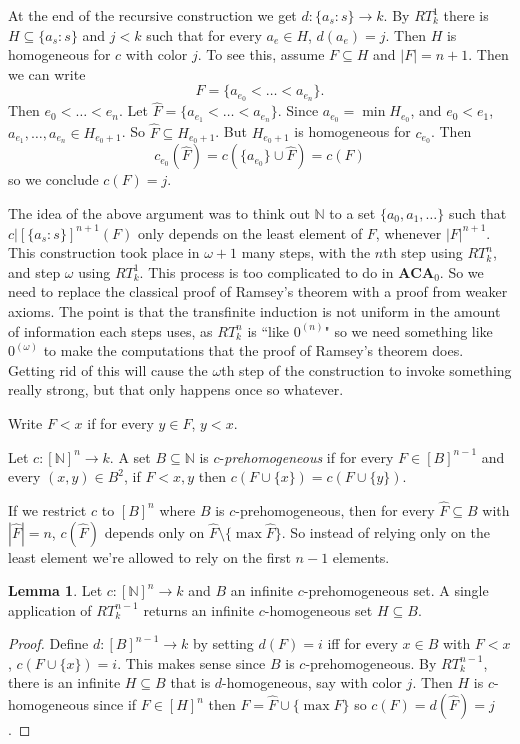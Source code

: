 \documentclass[12pt]{book}
\newcommand{\NN}{\mathbb{N}}
\newcommand{\ACA}{\mathbf{ACA}}
\newcommand{\dfn}[1]{\emph{#1}\index{#1}}
\theoremstyle{definition}
\newtheorem{lemma}[theorem]{Lemma}
\newenvironment{definition}
  {\pushQED{\qed}\renewcommand{\qedsymbol}{$\diamondsuit$}\definitionx}
  {\popQED\endexamplex}
\begin{document}
At the end of the recursive construction we get $d: \{a_s: s\} \to k$.
By $RT^1_k$ there is $H \subseteq \{a_s:s\}$ and $j < k$ such that for every $a_e \in H$, $d(a_e) = j$.
Then $H$ is homogeneous for $c$ with color $j$.
To see this, assume $F \subseteq H$ and $|F| = n + 1$.
Then we can write
$$F = \{a_{e_0} < \dots < a_{e_n}\}.$$
Then $e_0 < \dots < e_n$.
Let $\hat F = \{a_{e_1} < \dots < a_{e_n}\}$.
Since $a_{e_0} = \min H_{e_0}$, and $e_0 < e_1$, $a_{e_1}, \dots, a_{e_n} \in H_{e_0 + 1}$.
So $\hat F \subseteq H_{e_0 + 1}$.
But $H_{e_0 + 1}$ is homogeneous for $c_{e_0}$. Then
$$c_{e_0}(\hat F) = c(\{a_{e_0}\} \cup \hat F) = c(F)$$
so we conclude $c(F) = j$.

The idea of the above argument was to think out $\NN$ to a set $\{a_0, a_1, \dots\}$ such that $c|[\{a_s:s\}]^{n+1}(F)$ only depends on the least element of $F$, whenever $|F|^{n+1}$.
This construction took place in $\omega + 1$ many steps, with the $n$th step using $RT^n_k$, and step $\omega$ using $RT^1_k$.
This process is too complicated to do in $\ACA_0$.
So we need to replace the classical proof of Ramsey's theorem with a proof from weaker axioms.
The point is that the transfinite induction is not uniform in the amount of information each steps uses, as $RT^n_k$ is ``like $0^{(n)}$" so we need something like $0^{(\omega)}$ to make the computations that the proof of Ramsey's theorem does.
Getting rid of this will cause the $\omega$th step of the construction to invoke something really strong, but that only happens once so whatever.

Write $F < x$ if for every $y \in F$, $y < x$.

\begin{definition}
Let $c: [\NN]^n \to k$. A set $B \subseteq \NN$ is $c$-\dfn{prehomogeneous} if for every $F \in [B]^{n-1}$ and every $(x, y) \in B^2$, if $F < x, y$ then $c(F \cup \{x\}) = c(F \cup \{y\})$.
\end{definition}

If we restrict $c$ to $[B]^n$ where $B$ is $c$-prehomogeneous, then for every $\hat F \subseteq B$ with $|\hat F| = n$, $c(\hat F)$ depends only on $\hat F \setminus \{\max \hat F\}$.
So instead of relying only on the least element we're allowed to rely on the first $n - 1$ elements.

\begin{lemma}
Let $c: [\NN]^n \to k$ and $B$ an infinite $c$-prehomogeneous set.
A single application of $RT^{n-1}_k$ returns an infinite $c$-homogeneous set $H \subseteq B$.
\end{lemma}
\begin{proof}
Define $d: [B]^{n-1} \to k$ by setting $d(F) = i$ iff for every $x \in B$ with $F < x$, $c(F \cup \{x\}) = i$.
This makes sense since $B$ is $c$-prehomogeneous.
By $RT^{n-1}_k$, there is an infinite $H \subseteq B$ that is $d$-homogeneous, say with color $j$.
Then $H$ is $c$-homogeneous since if $F \in [H]^n$ then $F = \hat F \cup \{\max F\}$ so $c(F) = d(\hat F) = j$.
\end{proof}
\end{document}
